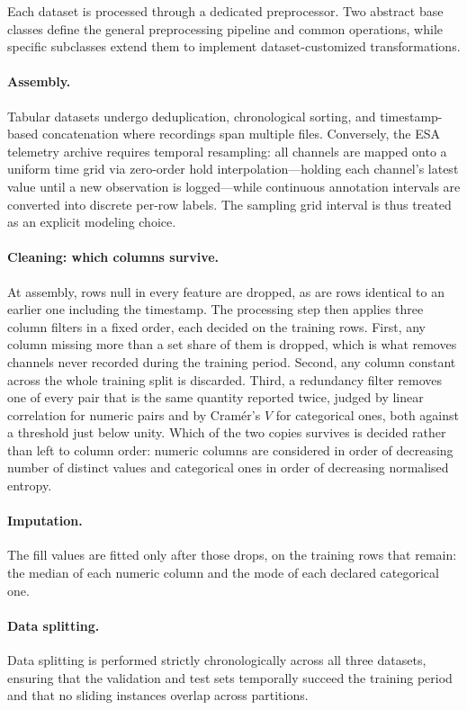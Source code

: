 \documentclass{article}
\begin{document}
Each dataset is processed through a dedicated preprocessor.
Two abstract base classes define the general preprocessing pipeline and common operations, 
while specific subclasses extend them to implement dataset-customized transformations.

\paragraph{Assembly.} Tabular datasets undergo deduplication,
chronological sorting, and timestamp-based concatenation where recordings span multiple files.
Conversely, the ESA telemetry archive requires temporal resampling: 
all channels are mapped onto a uniform time grid via zero-order hold interpolation—holding each channel's latest value until a new observation is logged—while 
continuous annotation intervals are converted into discrete per-row labels. 
The sampling grid interval is thus treated as an explicit modeling choice.

\paragraph{Cleaning: which columns survive.} At assembly, rows null in every feature are
dropped, as are rows identical to an earlier one including the timestamp. The processing
step then applies three column filters in a fixed order, each decided on the training rows.
First, any column missing more than a set share of them is dropped, which is what removes
channels never recorded during the training period. Second, any column constant across the
whole training split is discarded. Third, a redundancy filter removes one of every
pair that is the same quantity reported twice, judged by linear correlation for numeric
pairs and by Cram\'er's $V$ for categorical ones, both against a threshold just below
unity. 
Which of the two copies survives is decided rather than left to column order:
numeric columns are considered in order of decreasing number of distinct values and
categorical ones in order of decreasing normalised entropy.

\paragraph{Imputation.} The fill values are fitted only after those
drops, on the training rows that remain: the median of each numeric column and the mode of
each declared categorical one.

\paragraph{Data splitting.} Data splitting is performed strictly chronologically across all three datasets,
ensuring that the validation and test sets temporally succeed the training period and that no sliding instances overlap across partitions.
\end{document}
